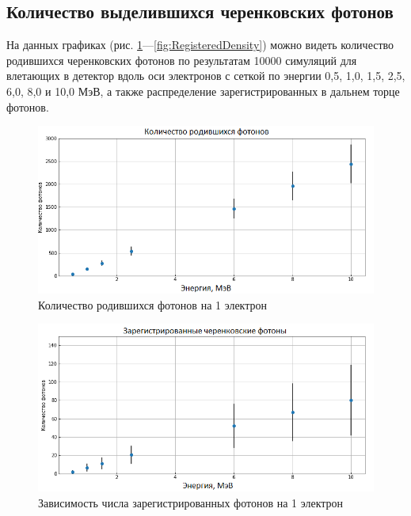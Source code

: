 \documentclass[12pt,a4paper]{report} %
\begin{document}
\subsection{Количество выделившихся черенковских фотонов}
На данных графиках (рис. \ref{fig:Cercount}---\ref{fig:RegisteredDensity}) можно видеть количество родившихся черенковских фотонов по результатам 10000 симуляций для влетающих в детектор вдоль оси электронов с сеткой по энергии 0,5, 1,0, 1,5, 2,5, 6,0, 8,0 и 10,0 МэВ, а также распределение зарегистрированных в дальнем торце фотонов. 
\begin{figure}[bh]
\begin{center}
	\includegraphics[width=.9\textwidth]{pictures/GEANT/cercount_dependence.png}
	\caption{Количество родившихся фотонов на 1 электрон}
	\label{fig:Cercount}
\end{center}
\end{figure}
\begin{figure}
\begin{center}
	\includegraphics[width=.9\textwidth]{pictures/GEANT/light_dependence.png}
	\caption{Зависимость числа зарегистрированных фотонов на 1 электрон}
	\label{fig:RegisteredLinear}
\end{center}
\end{figure}
\end{document}
